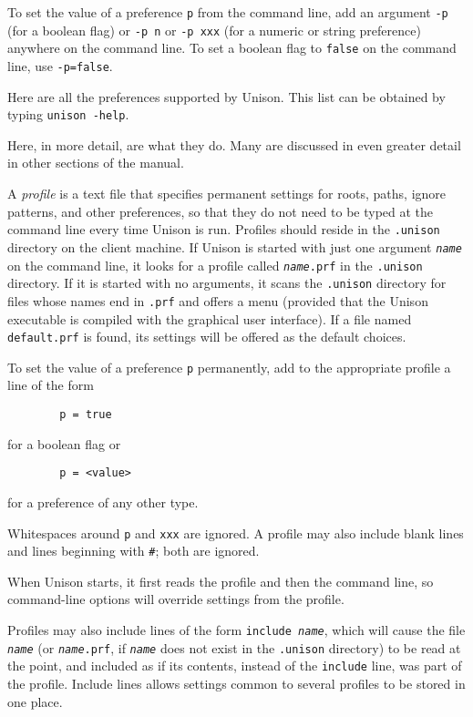 \documentclass{article}
\newcommand{\ARG}[1]{\texttt{\textit{#1}}}
\begin{document}
To set the value of a preference {\tt p} from the command line, add an
argument {\tt -p} (for a boolean flag) or {\tt -p n} or {\tt -p xxx} (for
a numeric or string preference) anywhere on the command line.  To set a
boolean flag to \verb|false| on the command line, use {\tt -p=false}.

Here are all the preferences supported by Unison.  This list can be
  obtained by typing {\tt unison -help}.
\begin{quote}
 
\end{quote}
Here, in more detail, are what they do.  Many are discussed in even greater
detail in other sections of the manual. 
%
 



A {\em profile} is a text file that specifies permanent settings for
roots, paths, ignore patterns, and other preferences, so that they do
not need to be typed at the command line every time Unison is run.
Profiles should reside in the \verb|.unison| directory on the client
machine.  If Unison is started with just one argument \ARG{name} on
the command line, it looks for a profile called \texttt{\ARG{name}.prf} in
the \verb|.unison| directory.  If it is started with no arguments, it
scans the \verb|.unison| directory for files whose names end in
\verb|.prf| and offers a menu (provided that the Unison executable is compiled with the graphical user interface).  If a file named \verb|default.prf| is
found, its settings will be offered as the default choices.

To set the value of a preference {\tt p} permanently, add to the
appropriate profile a line of the form
\begin{verbatim}
        p = true
\end{verbatim}
for a boolean flag or
\begin{verbatim}
        p = <value>
\end{verbatim}
for a preference of any other type.  

Whitespaces around {\tt p} and {\tt xxx} are ignored.
A profile may also include blank lines and lines beginning
with {\tt \#}; both are ignored.

When Unison starts, it first reads the profile and then the command
line, so command-line options will override settings from the
profile.  

Profiles may also include lines of the form \texttt{include
  \ARG{name}}, which will cause the file \ARG{name} (or
\texttt{\ARG{name}.prf}, if \ARG{name} does not exist in the
\verb+.unison+ directory) to be read at the point, and included as if
its contents, instead of the \texttt{include} line, was part of the
profile.  Include lines allows settings common to several profiles to
be stored in one place.
\end{document}
